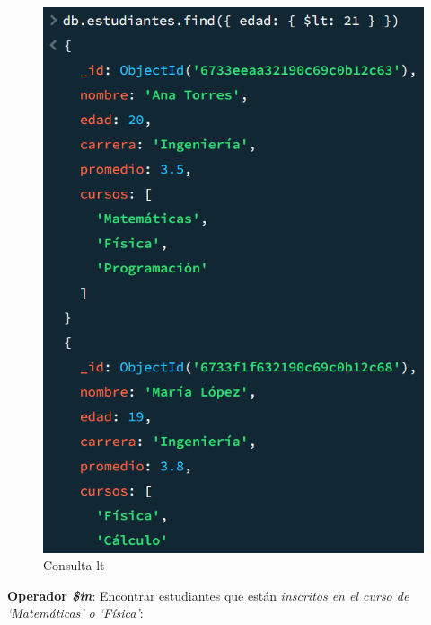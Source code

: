 \begin{figure}[H]
  \centering
  \includegraphics[scale = 0.8]{Imagenes/parte3/3.3.png}
  \caption{Consulta lt}
\end{figure}

\textbf{Operador \emph{\$in}}: Encontrar estudiantes que están \textit{inscritos en el curso de `Matemáticas' o `Física'}:

